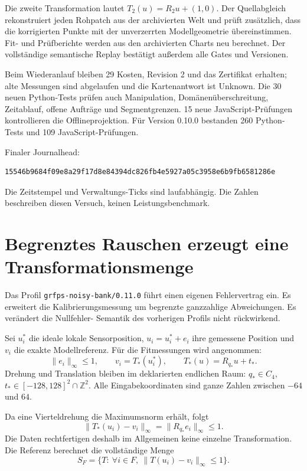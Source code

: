 \documentclass[11pt,a4paper]{article}
\newcommand{\nextsection}[2]{\clearpage{\color{accent}\small\textsf{#1}}\section{#2}}
\begin{document}
Die zweite Transformation lautet $T_2(u)=R_2u+(1,0)$.
Der Quellabgleich rekonstruiert jeden Rohpatch aus der archivierten
Welt und prüft zusätzlich, dass die korrigierten Punkte mit der
unverzerrten Modellgeometrie übereinstimmen. Fit- und Prüfberichte
werden aus den archivierten Charts neu berechnet. Der vollständige
semantische Replay bestätigt außerdem alle Gates und Versionen.

Beim Wiederanlauf bleiben 29 Kosten, Revision 2 und das Zertifikat
erhalten; alte Messungen sind abgelaufen und die Kartenantwort ist
Unknown. Die 30 neuen Python-Tests prüfen auch Manipulation,
Domänenüberschreitung, Zeitablauf, offene Aufträge und Segmentgrenzen.
15 neue JavaScript-Prüfungen kontrollieren die Offlineprojektion.
Für Version 0.10.0 bestanden 260 Python-Tests und 109 JavaScript-Prüfungen.

Finaler Journalhead:
\begin{lstlisting}
15546b9684f09e8a29f17d8e84394dc826fb4e5927a05c3958e6b9fb6581286e
\end{lstlisting}
Die Zeitstempel und Verwaltungs-Ticks sind laufabhängig.
Die Zahlen beschreiben diesen Versuch, keinen Leistungsbenchmark.

\nextsection{60 / FEHLERVERTRAG}{Begrenztes Rauschen erzeugt eine Transformationsmenge}
Das Profil \texttt{grfps-noisy-bank/0.11.0} führt einen eigenen
Fehlervertrag ein. Es erweitert die Kalibrierungsmessung um
begrenzte ganzzahlige Abweichungen. Es verändert die Nullfehler-
Semantik des vorherigen Profils nicht rückwirkend.

Sei $u_i^*$ die ideale lokale Sensorposition, $u_i=u_i^*+e_i$
ihre gemessene Position und $v_i$ die exakte Modellreferenz.
Für die Fitmessungen wird angenommen:
\[
 \|e_i\|_\infty\leq 1,\qquad
 v_i=T_*(u_i^*),\qquad T_*(u)=R_{q_*}u+t_*.
\]
Drehung und Translation bleiben im deklarierten endlichen Raum:
$q_*\in C_4$, $t_*\in[-128,128]^2\cap\mathbb Z^2$.
Alle Eingabekoordinaten sind ganze Zahlen zwischen $-64$ und $64$.

Da eine Vierteldrehung die Maximumsnorm erhält, folgt
\[
 \|T_*(u_i)-v_i\|_\infty=\|R_{q_*}e_i\|_\infty\leq1.
\]
Die Daten rechtfertigen deshalb im Allgemeinen keine einzelne
Transformation. Die Referenz berechnet die vollständige Menge
\[
 S_F=\{T:\ \forall i\in F,\ \|T(u_i)-v_i\|_\infty\leq1\}.
\]
\end{document}
